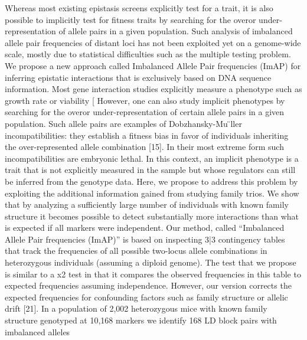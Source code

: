 Whereas most existing epistasis screens explicitly test for a trait, it is also possible to implicitly test for fitness traits by searching for the overor under-representation of allele pairs in a given population.  \cite{ackermann2012systematic}
Such analysis of imbalanced allele pair frequencies of distant loci has not been exploited yet on a genome-wide scale, mostly due to statistical difficulties such as the multiple testing problem. We propose a new approach called Imbalanced Allele Pair frequencies (ImAP) for inferring epistatic interactions that is exclusively based on DNA sequence information. \cite{ackermann2012systematic}
Most gene interaction studies explicitly measure a phenotype such as growth rate or viability [ \cite{ackermann2012systematic}
However, one can also study implicit phenotypes by searching for the overor under-representation of certain allele pairs in a given population. \cite{ackermann2012systematic}
Such allele pairs are examples of Dobzhansky-Mu ̈ller incompatibilities: they establish a fitness bias in favor of individuals inheriting the over-represented allele combination [15]. In their most extreme form such incompatibilities are embryonic lethal. \cite{ackermann2012systematic}
In this context, an implicit phenotype is a trait that is not explicitly measured in the sample but whose regulators can still be inferred from the genotype data. \cite{ackermann2012systematic}
Here, we propose to address this problem by exploiting the additional information gained from studying family trios. We show that by analyzing a sufficiently large number of individuals with known family structure it becomes possible to detect substantially more interactions than what is expected if all markers were independent. \cite{ackermann2012systematic}
Our method, called ``Imbalanced Allele Pair frequencies (ImAP)'' is based on inspecting 3|3 contingency tables that track the frequencies of all possible two-locus allele combinations in heterozygous individuals (assuming a diploid genome). The test that we propose is similar to a x2 test in that it compares the observed frequencies in this table to expected frequencies assuming independence. However, our version corrects the expected frequencies for confounding factors such as family structure or allelic drift [21]. \cite{ackermann2012systematic}
In a population of 2,002 heterozygous mice with known family structure genotyped at 10,168 markers we identify 168 LD block pairs with imbalanced alleles \cite{ackermann2012systematic}


